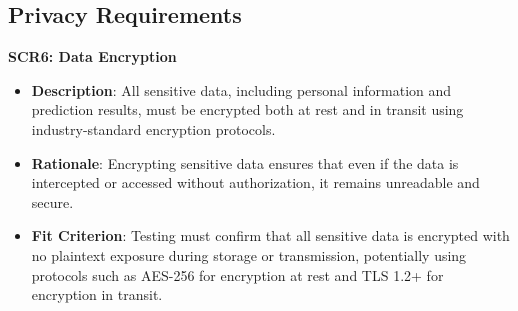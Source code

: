 \documentclass[12pt]{article}
\begin{document}
\subsection{Privacy Requirements}
\textbf{SCR6: Data Encryption}
\begin{itemize}
    \item \textbf{Description}: All sensitive data, including personal
    information and prediction results, must be encrypted both at rest and in
    transit using industry-standard encryption protocols.
    \item \textbf{Rationale}: Encrypting sensitive data ensures that even if the
    data is intercepted or accessed without authorization, it remains unreadable
    and secure.
    \item \textbf{Fit Criterion}: Testing must confirm that all sensitive data
    is encrypted with no plaintext exposure during storage or transmission,
    potentially using protocols such as AES-256 for encryption at rest and TLS
    1.2+ for encryption in transit.
\end{itemize}
\end{document}
